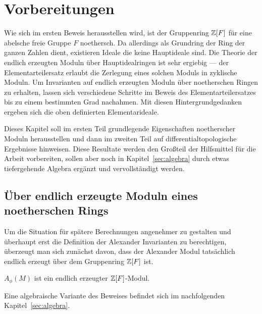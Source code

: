 
\section{Vorbereitungen}
\label{sec:vorbereitungen}

Wie sich im ersten Beweis herausstellen wird, ist der Gruppenring $\mathbb{Z}[F]$ für eine abelsche freie Gruppe $F$ noethersch. Da allerdings als Grundring der Ring der ganzen Zahlen dient, existieren Ideale die keine Hauptideale sind. Die Theorie der endlich erzeugten Moduln über Hauptidealringen ist sehr ergiebig --- der Elementarteilersatz erlaubt die Zerlegung eines solchen Moduls in zyklische Moduln. Um Invarianten auf endlich erzeugten Moduln über noetherschen Ringen zu erhalten, lassen sich verschiedene Schritte im Beweis des Elementarteilersatzes bis zu einem bestimmten Grad nachahmen. Mit diesen Hintergrundgedanken ergeben sich die oben definierten Elementarideale. 

Dieses Kapitel soll im ersten Teil grundlegende Eigenschaften noetherscher Moduln herausstellen und dann im zweiten Teil auf differentialtopologische Ergebnisse hinweisen. Diese Resultate werden den Großteil der Hilfsmittel für die Arbeit vorbereiten, sollen aber noch in Kapitel~\ref{sec:algebra} durch etwas tiefergehende Algebra ergänzt und vervollständigt werden.

\subsection{Über endlich erzeugte Moduln eines noetherschen Rings}

Um die Situation für spätere Berechnungen angenehmer zu gestalten und überhaupt erst die Definition der Alexander Invarianten zu berechtigen, überzeugt man sich zunächst davon, dass der Alexander Modul tatsächlich endlich erzeugt über dem Gruppenring $\mathbb{Z}[F]$ ist. 

\begin{prop}
\label{prop:alexendlerz}
		$A_\phi(M)$ ist ein endlich erzeugter $\mathbb{Z}[F]$-Modul.
\end{prop}
\begin{bem}\label{rem:AlexModulendlerz}
	Eine algebraische Variante des Beweises befindet sich im nachfolgenden Kapitel~\ref{sec:algebra}. 
\end{bem}

